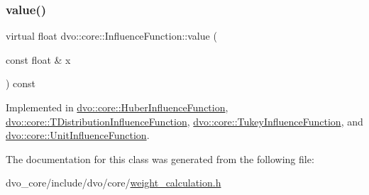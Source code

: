 \subsubsection{\texorpdfstring{value()}{value()}}
{\footnotesize\ttfamily virtual float dvo\+::core\+::\+Influence\+Function\+::value (\begin{DoxyParamCaption}\item[{const float \&}]{x }\end{DoxyParamCaption}) const\hspace{0.3cm}{\ttfamily [pure virtual]}}



Implemented in \mbox{\hyperlink{classdvo_1_1core_1_1_huber_influence_function_af41e9e57eedcd25db690a1f41f3d6c8a}{dvo\+::core\+::\+Huber\+Influence\+Function}}, \mbox{\hyperlink{classdvo_1_1core_1_1_t_distribution_influence_function_a3210e7ab6f57975751e75845d3d22598}{dvo\+::core\+::\+T\+Distribution\+Influence\+Function}}, \mbox{\hyperlink{classdvo_1_1core_1_1_tukey_influence_function_a3a1829e6316ecffdceea8c54169c5ef1}{dvo\+::core\+::\+Tukey\+Influence\+Function}}, and \mbox{\hyperlink{classdvo_1_1core_1_1_unit_influence_function_a889eacebc6bcb0209a8ce37742dbbe71}{dvo\+::core\+::\+Unit\+Influence\+Function}}.



The documentation for this class was generated from the following file\+:\begin{DoxyCompactItemize}
\item 
dvo\+\_\+core/include/dvo/core/\mbox{\hyperlink{weight__calculation_8h}{weight\+\_\+calculation.\+h}}\end{DoxyCompactItemize}
